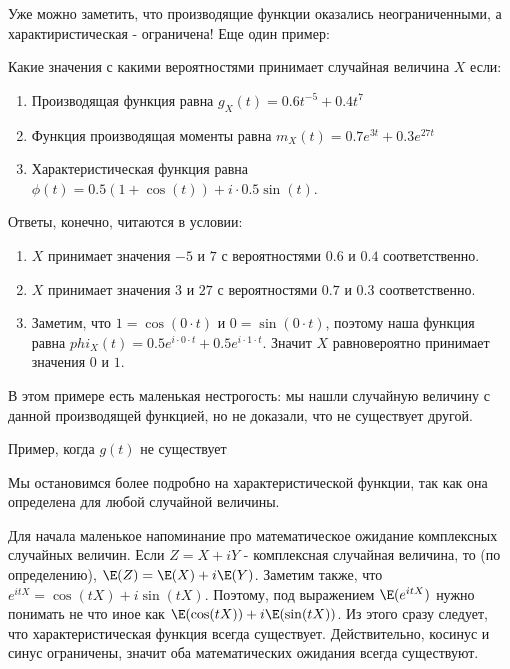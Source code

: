 {\begin{myex}
\end{myex}

Уже можно заметить, что производящие функции оказались неограниченными, а характиристическая - ограничена! Еще один пример:

\begin{myex} Какие значения с какими вероятностями принимает случайная величина $X$ если:

\begin{enumerate}
\item Производящая функция равна $g_{X}(t)=0.6t^{-5}+0.4t^{7}$
\item Функция производящая моменты равна $m_{X}(t)=0.7e^{3t}+0.3e^{27t}$
\item Характеристическая функция равна $\phi(t)=0.5(1+\cos(t))+i\cdot 0.5\sin(t)$.
\end{enumerate}
Ответы, конечно, читаются в условии:

\begin{enumerate}
\item $X$ принимает значения $-5$ и $7$ с вероятностями $0.6$ и $0.4$ соответственно.
\item $X$ принимает значения $3$ и $27$ с вероятностями $0.7$ и $0.3$ соответственно.
\item Заметим, что $1=\cos(0\cdot t)$ и $0=\sin(0\cdot t)$, поэтому наша функция равна $phi_{X}(t)=0.5e^{i\cdot 0\cdot t}+0.5e^{i\cdot 1\cdot t}$. Значит $X$ равновероятно принимает значения $0$ и $1$.
\end{enumerate}

В этом примере есть маленькая нестрогость: мы нашли случайную величину с данной производящей функцией, но не доказали, что не существует другой.
\end{myex}

\begin{myex} Пример, когда $g(t)$ не существует
\end{myex}

Мы остановимся более подробно на характеристической функции, так как она определена для любой случайной величины.

Для начала маленькое напоминание про математическое ожидание комплексных случайных величин. Если $Z=X+iY$ - комплексная случайная величина, то (по определению), $\E(Z)=\E(X)+i\E(Y)$. Заметим также, что $e^{itX}=\cos(tX)+i\sin(tX)$. Поэтому, под выражением $\E(e^{itX})$ нужно понимать не что иное как $\E(\cos(tX))+i\E(\sin(tX))$. Из этого сразу следует, что характеристическая функция всегда существует. Действительно, косинус и синус ограничены, значит оба математических ожидания всегда существуют.

}
